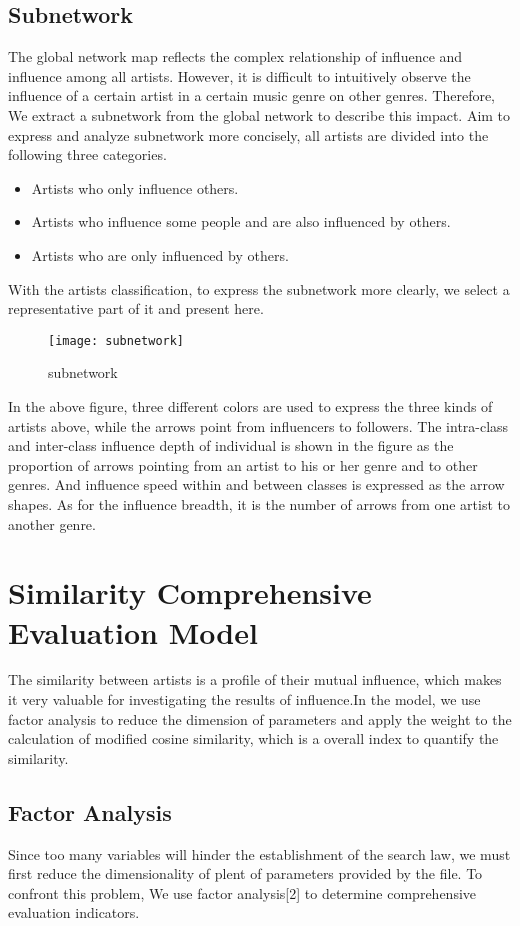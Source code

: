 \documentclass{mcmthesis}
\begin{document}
\subsection{Subnetwork}
The global network map reflects the complex relationship of influence and influence among all artists. However, it is difficult to intuitively observe the influence of a certain artist in a certain music genre on other genres. Therefore, We extract a subnetwork from the global network to describe this impact. Aim to express and analyze subnetwork more concisely, all artists are divided into the following three categories.
\begin{itemize}
	\item Artists who only influence others.
	\item Artists who influence some people and are also influenced by others.
	\item Artists who are only influenced by others.
\end{itemize}
With the artists classification, to express the subnetwork more clearly, we select a representative part of it and present here.
\begin{figure}[H]%
	\small
	\centering
	\texttt{[image: subnetwork]}%
	\caption{subnetwork}\label{fig:7}%
\end{figure}
In the above figure, three different colors are used to express the three kinds of artists above, while the arrows point from influencers to followers. The intra-class and inter-class influence depth of individual is shown in the figure as the proportion of arrows pointing from an artist to his or her genre and to other genres. And influence speed within and between classes is expressed as the arrow shapes. As for the influence breadth, it is the number of arrows from one artist to another genre.

\section{Similarity Comprehensive Evaluation Model}
The similarity between artists is a profile of their mutual influence, which makes it very valuable for investigating the results of influence.In the model, we use factor analysis to reduce the dimension of parameters and apply the weight to the calculation of modified cosine similarity, which is a overall index to quantify the similarity.

\subsection{Factor Analysis}
Since too many variables will hinder the establishment of the search law, we must first reduce the dimensionality of plent of  parameters provided by the file. To confront this problem, We use factor analysis[2] to determine comprehensive evaluation indicators.
\end{document}
